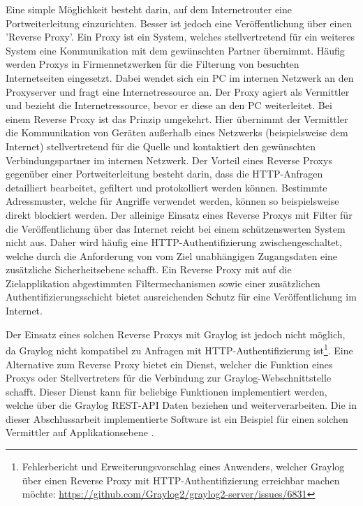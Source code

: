 Eine simple Möglichkeit besteht darin, auf dem Internetrouter eine Portweiterleitung einzurichten. Besser ist jedoch eine Veröffentlichung über einen 'Reverse Proxy'. Ein Proxy ist ein System, welches stellvertretend für ein weiteres System eine Kommunikation mit dem gewünschten Partner übernimmt. Häufig werden Proxys in Firmennetzwerken für die Filterung von besuchten Internetseiten eingesetzt. Dabei wendet sich ein PC im internen Netzwerk an den Proxyserver und fragt eine Internetressource an. Der Proxy agiert als Vermittler und bezieht die Internetressource, bevor er diese an den PC weiterleitet. Bei einem Reverse Proxy ist das Prinzip umgekehrt. Hier übernimmt der Vermittler die Kommunikation von Geräten außerhalb eines Netzwerks (beispielsweise dem Internet) stellvertretend für die Quelle und kontaktiert den gewünschten Verbindungspartner im internen Netzwerk. Der Vorteil eines Reverse Proxys gegenüber einer Portweiterleitung besteht darin, dass die HTTP-Anfragen detailliert bearbeitet, gefiltert und protokolliert werden können. Bestimmte Adressmuster, welche für Angriffe verwendet werden, können so beispielsweise direkt blockiert werden. Der alleinige Einsatz eines Reverse Proxys mit Filter für die Veröffentlichung über das Internet reicht bei einem schützenswerten System nicht aus. Daher wird häufig eine HTTP-Authentifizierung zwischengeschaltet, welche durch die Anforderung von vom Ziel unabhängigen Zugangsdaten eine zusätzliche Sicherheitsebene schafft. Ein Reverse Proxy mit auf die Zielapplikation abgestimmten Filtermechanismen sowie einer zusätzlichen Authentifizierungsschicht bietet ausreichenden Schutz für eine Veröffentlichung im Internet. 

Der Einsatz eines solchen Reverse Proxys mit Graylog ist jedoch nicht möglich, da Graylog nicht kompatibel zu Anfragen mit HTTP-Authentifizierung ist\footnote{Fehlerbericht und Erweiterungsvorschlag eines Anwenders, welcher Graylog über einen Reverse Proxy mit HTTP-Authentifizierung erreichbar machen möchte: \url{https://github.com/Graylog2/graylog2-server/issues/6831}}. Eine Alternative zum Reverse Proxy bietet ein Dienst, welcher die Funktion eines Proxys oder Stellvertreters für die Verbindung zur Graylog-Webschnittstelle schafft. Dieser Dienst kann für beliebige Funktionen implementiert werden, welche über die Graylog REST-API Daten beziehen und weiterverarbeiten. Die in dieser Abschlussarbeit implementierte Software ist ein Beispiel für einen solchen Vermittler auf Applikationsebene \cite[S. 12 ff.]{bsi-websec}.
